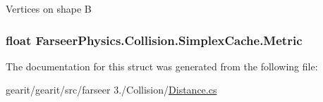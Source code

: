 Vertices on shape B 

\hypertarget{struct_farseer_physics_1_1_collision_1_1_simplex_cache_a7848e47e9ee157cd5da79d85f64577ad}{
\subsubsection[{Metric}]{\setlength{\rightskip}{0pt plus 5cm}float Farseer\+Physics.\+Collision.\+Simplex\+Cache.\+Metric}}\label{struct_farseer_physics_1_1_collision_1_1_simplex_cache_a7848e47e9ee157cd5da79d85f64577ad}


The documentation for this struct was generated from the following file\+:\begin{DoxyCompactItemize}
\item 
gearit/gearit/src/farseer 3./\+Collision/\hyperlink{_distance_8cs}{Distance.\+cs}\end{DoxyCompactItemize}
